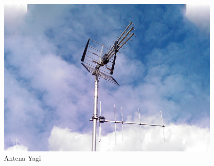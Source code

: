 \begin{figure}[h]
    \centering
        \includegraphics[width=12cm]{archivos/dipolo/yagi}
        \caption{Antena Yagi}
        \label{fig:yagi}
\end{figure}





